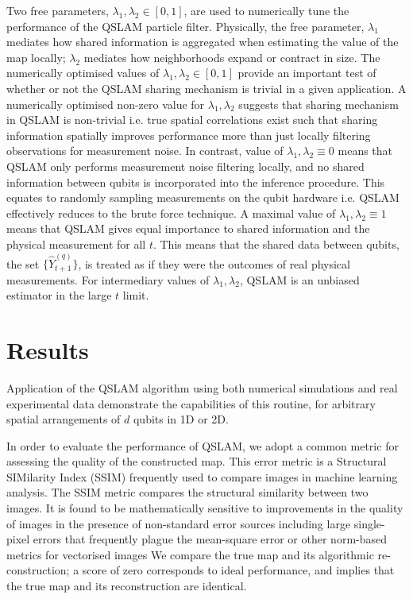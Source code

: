 \documentclass[reprint,longbibliography]{revtex4-1} %
\begin{document}
Two free parameters, $\lambda_1, \lambda_2 \in [0,1]$, are used to numerically tune the performance of the QSLAM particle filter. Physically, the free parameter, $\lambda_1$ mediates how shared information is aggregated when estimating the value of the map locally; $\lambda_2$ mediates how neighborhoods expand or contract in size. The numerically optimised values of $\lambda_1, \lambda_2 \in [0,1]$ provide an important test of whether or not the QSLAM sharing mechanism is trivial in a given application. A numerically optimised non-zero value for $\lambda_1, \lambda_2$ suggests that sharing mechanism in QSLAM is non-trivial i.e. true spatial correlations exist such that sharing information spatially improves performance more than just locally filtering observations for measurement noise. In contrast, value of $\lambda_1, \lambda_2 \equiv 0$  means that QSLAM only performs measurement noise filtering locally, and no shared information between qubits is incorporated into the inference procedure. This equates to randomly sampling measurements on the qubit hardware i.e. QSLAM effectively reduces to the brute force technique. A maximal value of $\lambda_1, \lambda_2 \equiv 1$ means that QSLAM gives equal importance to shared information and the physical measurement for all $t$. This means that the shared data between qubits, the set $\{\hat{Y}_{t+1}^{(q)} \}$, is treated as if they were the outcomes of real physical measurements. For intermediary values of $\lambda_1, \lambda_2$, QSLAM is an unbiased estimator in the large $t$ limit. 

\section{Results \label{sec:results}}

Application of the QSLAM algorithm using both numerical simulations and real experimental data demonstrate the capabilities of this routine, for arbitrary spatial arrangements of $d$ qubits in 1D or 2D. 

In order to evaluate the performance of QSLAM, we adopt a common metric for assessing the quality of the constructed map. This error metric is a Structural SIMilarity Index (SSIM) frequently used to compare images in machine learning analysis. The SSIM metric compares the structural similarity between two images. It is found to be mathematically sensitive to improvements in the quality of images in the presence of non-standard error sources including large single-pixel errors that frequently plague the mean-square error or other norm-based metrics for vectorised images \cite{wang2004image,chen2009similarity,wang2009mean}  We compare the true map and its algorithmic re-construction; a score of zero corresponds to ideal performance, and implies that the true map and its reconstruction are identical. 
\end{document}
